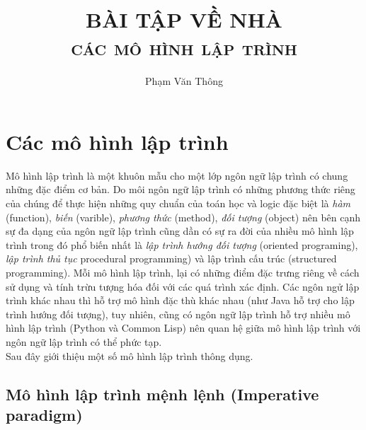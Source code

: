\documentclass[10pt, a4paper]{article}
\begin{document}
\hypersetup{colorlinks=false, urlcolor=blue, linkcolor=green}
\pagestyle{fancy}
\cfoot{}
\rfoot{\thepage}


\author{Phạm Văn Thông}
\title{\textbf{\Huge{BÀI TẬP VỀ NHÀ}}\\ \textsc{các mô hình lập trình}}
\maketitle
\vspace{1cm}

\section{Các mô hình lập trình}

Mô hình lập trình là một khuôn mẫu cho một lớp ngôn ngữ lập trình có chung những đặc điểm cơ bản. Do môi ngôn ngữ lập trình có những phương thức riêng của chúng để thực hiện những quy chuẩn của toán học và logic đặc biệt là \emph{hàm} (function), \emph{biến} (varible), \emph{phương thức} (method), \emph{đối tượng} (object) nên bên cạnh sự đa dạng của ngôn ngữ lập trình cũng dần có sự ra đời của nhiều mô hình lập trình trong đó phổ biến nhất là \emph{lập trình hướng đối tượng} (oriented programing), \emph{lập trình thủ tục} procedural programming) và lập trình cấu trúc (structured programming). Mỗi mô hình lập trình, lại có những điểm đặc trưng riêng về cách sử dụng và tính trừu tượng hóa đối với các quá trình xác định. Các ngôn ngử lập trình khác nhau thì hỗ trợ mô hình đặc thù khác nhau (như \textsf{Java} hỗ trợ cho lập trình hướng đối tượng), tuy nhiên, cũng có ngôn ngữ lập trình hỗ trợ nhiều mô hình lập trình (\textsf{Python} và \textsf{Common Lisp}) nên quan hệ giữa mô hình lập trình với ngôn ngữ lập trình có thể phức tạp.\\

Sau đây giới thiệu một số mô hình lập trình thông dụng.

\subsection{Mô hình lập trình mệnh lệnh (Imperative paradigm)}
\end{document}
